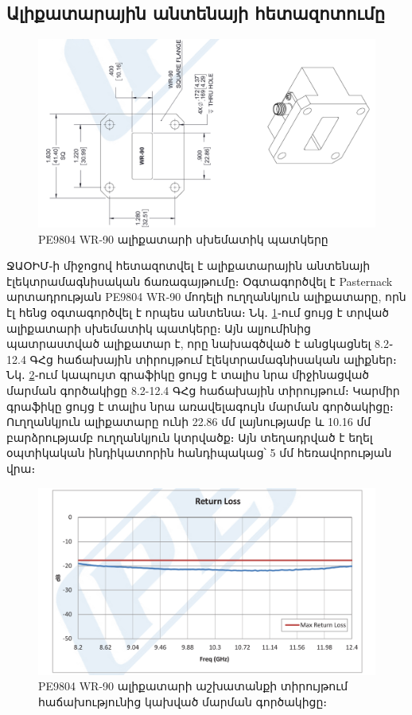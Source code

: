 \documentclass[12pt, fleqn]{report}
\begin{document}
\subsection{Ալիքատարային անտենայի հետազոտումը}
\begin{figure}
    \centering
    \includegraphics[width=1.0\textwidth]{data/waveguide/waveguide-scheme.png}
    \caption{PE9804 WR-90 ալիքատարի սխեմատիկ պատկերը}
    \label{fig:waveguide-scheme}
\end{figure}
ՋԱՕԻՄ֊ի միջոցով հետազոտվել է ալիքատարային անտենայի էլեկտրամագնիսական ճառագայթումը։ Օգտագործվել է Pasternack արտադրության PE9804 WR-90 մոդելի ուղղանկյուն ալիքատարը, որն էլ հենց օգտագործվել է որպես անտենա։ Նկ․ \ref{fig:waveguide-scheme}֊ում ցույց է տրված ալիքատարի սխեմատիկ պատկերը։ Այն ալյումինից պատրաստված ալիքատար է, որը նախագծված է անցկացնել 8.2֊12.4 ԳՀց հաճախային տիրույթում էլեկտրամագնիսական ալիքներ։ Նկ․ \ref{fig:waveguide-return-loss}֊ում կապույտ գրաֆիկը ցույց է տալիս նրա միջինացված մարման գործակիցը 8.2-12.4 ԳՀց հաճախային տիրույթում։ Կարմիր գրաֆիկը ցույց է տալիս նրա առավելագույն մարման գործակիցը։ Ուղղանկյուն ալիքատարը ունի 22.86 մմ լայնությամբ և 10.16 մմ բարձրությամբ ուղղանկյուն կտրվածք։ Այն տեղադրված է եղել օպտիկական ինդիկատորին հանդիպակաց՝ 5 մմ հեռավորության վրա։
\begin{figure}
    \centering
    \includegraphics[width=1.0\textwidth]{data/waveguide/return-loss.png}
    \caption{PE9804 WR-90 ալիքատարի աշխատանքի տիրույթում հաճախությունից կախված մարման գործակիցը։}
    \label{fig:waveguide-return-loss}
\end{figure}
\end{document}
